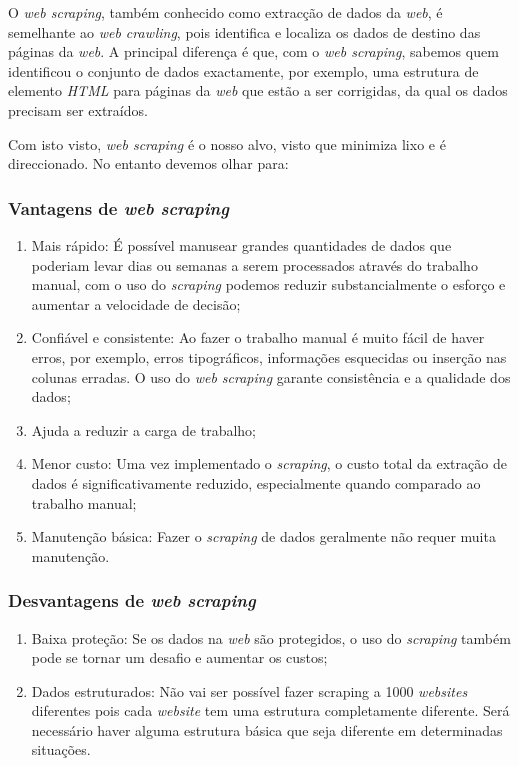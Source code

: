 O \textit{web scraping}, também conhecido como extracção de dados da \textit{web}, é semelhante ao \textit{web crawling}, pois identifica e localiza os dados de destino das páginas da \textit{web}.
A principal diferença é que, com o \textit{web scraping}, sabemos quem identificou o conjunto de dados exactamente, por exemplo, uma estrutura de elemento \textit{HTML} para páginas da \textit{web} que estão a ser corrigidas, da qual os dados precisam ser extraídos.

Com isto visto, \textit{web scraping} é o nosso alvo, visto que minimiza lixo e é direccionado.
No entanto devemos olhar para:

\subsubsection{Vantagens de \textit{web scraping}}

\begin{enumerate}
  \setlength\itemsep{0.05em}
  \item Mais rápido: É possível manusear grandes quantidades de dados que poderiam levar dias ou semanas a serem processados através do trabalho manual, com o uso do \textit{scraping} podemos reduzir substancialmente o esforço e aumentar a velocidade de decisão;
  \item Confiável e consistente: Ao fazer o trabalho manual é muito fácil de haver erros, por exemplo, erros tipográficos, informações esquecidas ou inserção nas colunas erradas. O uso do \textit{web scraping} garante consistência e a qualidade dos dados;
  \item Ajuda a reduzir a carga de trabalho;
  \item Menor custo: Uma vez implementado o \textit{scraping}, o custo total da extração de dados é significativamente reduzido, especialmente quando comparado ao trabalho manual;
  \item Manutenção básica: Fazer o \textit{scraping} de dados geralmente não requer muita manutenção.
\end{enumerate}

\subsubsection{Desvantagens de \textit{web scraping}}

\begin{enumerate}
  \setlength\itemsep{0.05em}
  \item Baixa proteção: Se os dados na \textit{web} são protegidos, o uso do \textit{scraping} também pode se tornar um desafio e aumentar os custos;
  \item Dados estruturados: Não vai ser possível fazer scraping a 1000 \textit{websites} diferentes pois cada \textit{website} tem uma estrutura completamente diferente. Será necessário haver alguma estrutura básica que seja diferente em determinadas situações.
\end{enumerate}

